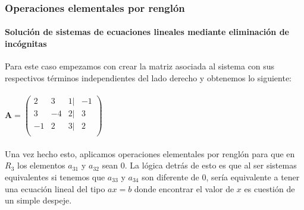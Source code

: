 \documentclass[11pt]{beamer}
\begin{document}
\begin{frame}
\frametitle{Operaciones elementales por renglón}
\framesubtitle{Solución de sistemas de ecuaciones lineales mediante eliminación de incógnitas}
Para este caso empezamos con crear la matriz asociada al sistema con sus respectivos términos independientes del lado derecho y obtenemos lo siguiente: \\ \hspace{0cm} \\
${\displaystyle \mathbf {A} ={\begin{pmatrix}2&3&1|&-1\\3&-4&2|&3\\-1&2&3|&2\\\end{pmatrix}}}$\\ \hspace{0cm} \\ 
Una vez hecho esto, aplicamos operaciones elementales por renglón para que en $R_3$ los elementos $a_{31}$ y $a_{32}$ sean 0. La lógica detrás de esto es que al ser sistemas equivalentes si tenemos que $a_{33}$ y $a_{34}$ son diferente de 0, sería equivalente a tener una ecuación lineal del tipo $ax = b$ donde encontrar el valor de $x$ es cuestión de un simple despeje.	
\end{frame}
\end{document}
